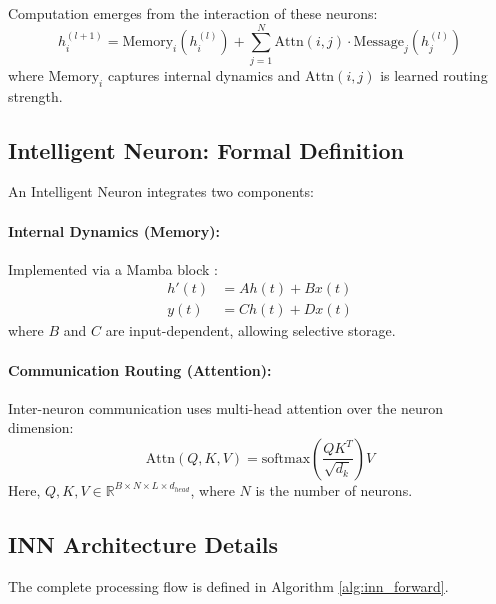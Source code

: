 \documentclass{article}
\begin{document}
Computation emerges from the interaction of these neurons:
\begin{equation}
h_i^{(l+1)} = \text{Memory}_i(h_i^{(l)}) + \sum_{j=1}^{N} \text{Attn}(i, j) \cdot \text{Message}_j(h_j^{(l)})
\end{equation}
where $\text{Memory}_i$ captures internal dynamics and $\text{Attn}(i,j)$ is learned routing strength.

\subsection{Intelligent Neuron: Formal Definition}

An Intelligent Neuron integrates two components:

\paragraph{Internal Dynamics (Memory):} Implemented via a Mamba block \cite{gu2023mamba}:
\begin{align}
h'(t) &= A h(t) + B x(t) \\
y(t) &= C h(t) + D x(t)
\end{align}
where $B$ and $C$ are input-dependent, allowing selective storage.

\paragraph{Communication Routing (Attention):} Inter-neuron communication uses multi-head attention over the neuron dimension:
\begin{equation}
\text{Attn}(Q, K, V) = \text{softmax}\left(\frac{QK^T}{\sqrt{d_k}}\right) V
\end{equation}
Here, $Q, K, V \in \mathbb{R}^{B \times N \times L \times d_{head}}$, where $N$ is the number of neurons.

\subsection{INN Architecture Details}

The complete processing flow is defined in Algorithm \ref{alg:inn_forward}.
\end{document}
